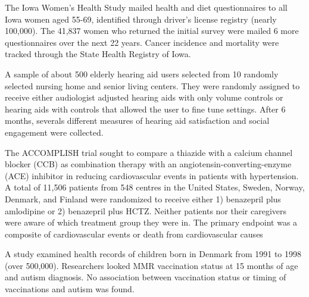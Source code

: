 \documentclass{article}
\begin{document}
\begin{flushleft}
\begin{enumalpha}
\item The Iowa Women's Health Study mailed health and diet questionnaires to all Iowa women aged 55-69, identified through driver's license registry (nearly 100,000). The 41,837 women who returned the initial survey were mailed 6 more questionnaires over the next 22 years. Cancer incidence and mortality were tracked through the State Health Registry of Iowa.
\vspace{1in}

\item A sample of about 500 elderly hearing aid users selected from 10 randomly selected nursing home and senior living centers. They were randomly assigned to receive either audiologist adjusted hearing aids with only volume controls or hearing aids with controls that allowed the user to fine tune settings. After 6 months, severals different measures of hearing aid satisfaction and social engagement were collected.
\vspace{1in}

\item The ACCOMPLISH trial sought to compare a thiazide with a calcium channel blocker (CCB) as combination therapy with an angiotensin-converting-enzyme (ACE) inhibitor in reducing cardiovascular events in patients with hypertension. A total of 11,506 patients from 548 centres in the United States, Sweden, Norway, Denmark, and Finland were randomized to receive either 1) benazepril plus amlodipine or 2) benazepril plus HCTZ. Neither patients nor their caregivers were aware of which treatment group they were in. The primary endpoint was a composite of cardiovascular events or death from cardiovascular causes
\vspace{1in}

\item A study examined health records of children born in Denmark from 1991 to 1998 (over 500,000). Researchers looked MMR vaccination status at 15 months of age and autism diagnosis. No association between vaccination status or timing of vaccinations and autism was found.
\end{enumalpha} 
\end{flushleft}
\end{document}
